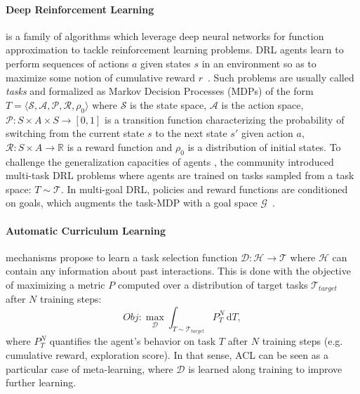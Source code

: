 \documentclass{article}
\begin{document}
\paragraph{Deep Reinforcement Learning} \hspace{-0.2cm}is a family of algorithms which leverage deep neural networks for function approximation to tackle reinforcement learning problems. DRL agents learn to perform sequences of actions $a$ given states $s$ in an environment so as to maximize some notion of cumulative reward $r$~\cite{sutton2018reinforcement}.
%
Such problems are usually called \textit{tasks} and formalized as Markov Decision Processes (MDPs) of the form $T=\langle \mathcal{S},\mathcal{A},\mathcal{P}, \mathcal{R}, \rho_0 \rangle$ where $\mathcal{S}$ is the state space, $\mathcal{A}$ is the action space, $\mathcal{P}:S \times A \times S \rightarrow [0,1]$ is a transition function characterizing the probability of switching from the current state $s$ to the next state $s'$ given action $a$, $\mathcal{R}:S \times A  \rightarrow \mathbb{R}$ is a reward function and $\rho_0$ is a distribution of initial states. 
%
To challenge the generalization capacities of agents \cite{coinrun}, the community introduced multi-task DRL problems where agents are trained on tasks sampled from a task space: $T \sim \mathcal{T}$. In multi-goal DRL, policies and reward functions are conditioned on goals, which augments the task-MDP with a goal space $\mathcal{G}$~\cite{uvfa}.

\paragraph{Automatic Curriculum Learning} \hspace{-0.2cm} mechanisms propose to learn a task selection function $\mathcal{D}:\mathcal{\mathcal{H}\to\mathcal{T}}$ where $\mathcal{H}$ can contain any information about past interactions. This is done with the objective of maximizing a metric $P$ computed over a distribution of target tasks $\mathcal{T}_{target}$ after $N$ training steps:
\begin{equation}
    \label{eq:1}
    Obj: \max_{\mathcal{D}} \int_{T\sim \mathcal{T}_{target}} \! P_T^N\, \mathrm{d}T,
\end{equation}
where $P_T^N$ quantifies the agent's behavior on task $T$ after $N$ training steps (e.g. cumulative reward, exploration score). In that sense, ACL can be seen as a particular case of meta-learning, where $\mathcal{D}$ is learned along training to improve further learning. 
\end{document}
